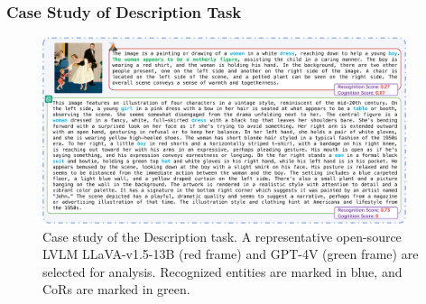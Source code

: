 \subsubsection{Case Study of Description Task}

\begin{figure}[th]
    \centering
    \includegraphics[width=0.95\textwidth]{figs/case_single3.pdf}
    \caption{Case study of the Description task. 
    A representative open-source LVLM LLaVA-v1.5-13B (red frame) and GPT-4V (green frame) are selected for analysis. 
    Recognized entities are marked in \textcolor{c3}{blue}, and CoRs are marked in \textcolor{c2}{green}.
    }
    \label{fig:case}
\end{figure}

